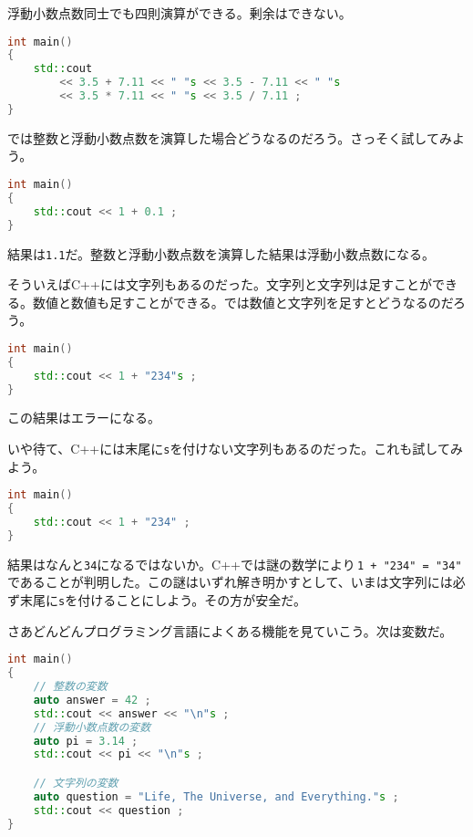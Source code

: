 浮動小数点数同士でも四則演算ができる。剰余はできない。

\ifTombow\pagebreak\fi
\begin{lstlisting}[language={C++}]
int main()
{
    std::cout
        << 3.5 + 7.11 << " "s << 3.5 - 7.11 << " "s
        << 3.5 * 7.11 << " "s << 3.5 / 7.11 ;
}
\end{lstlisting}

では整数と浮動小数点数を演算した場合どうなるのだろう。さっそく試してみよう。

\begin{lstlisting}[language={C++}]
int main()
{
    std::cout << 1 + 0.1 ;
}
\end{lstlisting}

結果は\texttt{1.1}だ。整数と浮動小数点数を演算した結果は浮動小数点数になる。

そういえばC++には文字列もあるのだった。文字列と文字列は足すことができる。数値と数値も足すことができる。では数値と文字列を足すとどうなるのだろう。

\begin{lstlisting}[language={C++}]
int main()
{
    std::cout << 1 + "234"s ;
}
\end{lstlisting}

この結果はエラーになる。

いや待て、C++には末尾に\texttt{s}を付けない文字列もあるのだった。これも試してみよう。

\begin{lstlisting}[language={C++}]
int main()
{
    std::cout << 1 + "234" ;
}
\end{lstlisting}

結果はなんと\texttt{34}になるではないか。C++では謎の数学により\,\texttt{1 + "234" = "34"}\,であることが判明した。この謎はいずれ解き明かすとして、いまは文字列には必ず末尾に\texttt{s}を付けることにしよう。その方が安全だ。

\clearpage
{}

さあどんどんプログラミング言語によくある機能を見ていこう。次は変数だ。

\begin{lstlisting}[language={C++}]
int main()
{
    // 整数の変数
    auto answer = 42 ;
    std::cout << answer << "\n"s ;
    // 浮動小数点数の変数
    auto pi = 3.14 ;
    std::cout << pi << "\n"s ;

    // 文字列の変数
    auto question = "Life, The Universe, and Everything."s ;
    std::cout << question ;
}
\end{lstlisting}

